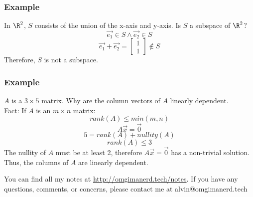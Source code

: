 \documentclass[letterpaper, 12pt]{math}
\begin{document}
\subsubsection*{Example}
In \( \R^2 \), \( S \) consists of the union of the x-axis and y-axis. Is
\( S \) a subspace of \( \R^2 \)?
\[ \vec{e_1}\in S \wedge \vec{e_2}\in S \]
\[ \vec{e_1}+\vec{e_2} = \begin{bmatrix}1 \\ 1\end{bmatrix}\notin S \]
Therefore, \( S \) is not a subspace.

\subsubsection*{Example}
\( A \) is a \( 3\times 5 \) matrix. Why are the column vectors of \( A \)
linearly dependent. \\
Fact: If \( A \) is an \( m\times n \) matrix:
\[ rank(A) \le min(m,n) \]
\[ A\vec{x} = \vec{0} \]
\[ 5 = rank(A)+nullity(A) \]
\[ rank(A) \le 3 \]
The nullity of \( A \) must be at least 2, therefore \( A\vec{x} = \vec{0} \)
has a non-trivial solution. Thus, the columns of \( A \) are linearly
dependent.

\begin{center}
  You can find all my notes at \url{http://omgimanerd.tech/notes}. If you have
  any questions, comments, or concerns, please contact me at
  alvin@omgimanerd.tech
\end{center}
\end{document}
